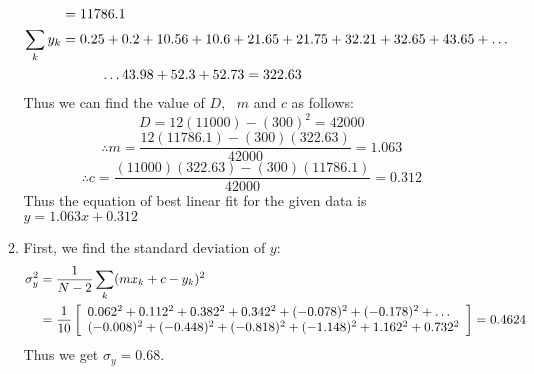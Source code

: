 \documentclass[a4paper, 11pt]{article}
\begin{document}
\begin{enumerate}[label=(\arabic*),leftmargin=*]
\begin{enumerate}[label=\roman*)]
\begin{align*}
	&=11786.1\\
	\sum_k y_k&=0.25+0.2+10.56+10.6+21.65+21.75+32.21+32.65+43.65+\dots\\
	&\hspace{10mm}\dots 43.98+52.3+52.73=322.63
\end{align*}
Thus we can find the value of $D,\text{ }m$ and $c$ as follows:
$$D=12(11000)-(300)^2=42000$$
$$\boxed{\therefore m=\frac{12(11786.1)-(300)(322.63)}{42000}=1.063}$$
$$\boxed{\therefore c=\frac{(11000)(322.63)-(300)(11786.1)}{42000}=0.312}$$
Thus the equation of best linear fit for the given data is $y=1.063x+0.312$
	\item First, we find the standard deviation of $y$:
\begin{align*}
	\sigma_y^2&=\frac{1}{N-2}\sum_k (mx_k+c-y_k)^2\\
	&=\frac{1}{10}\left[\begin{array}{l}
		0.062^2+0.112^2+0.382^2+0.342^2+(-0.078)^2+(-0.178)^2+\dots\\
		\hspace{0mm}(-0.008)^2+(-0.448)^2+(-0.818)^2+(-1.148)^2+1.162^2+0.732^2
	\end{array}\right]=0.4624\\
\end{align*}
Thus we get $\boxed{\sigma_y=0.68}$.


\end{enumerate}
\end{enumerate}
\end{document}
